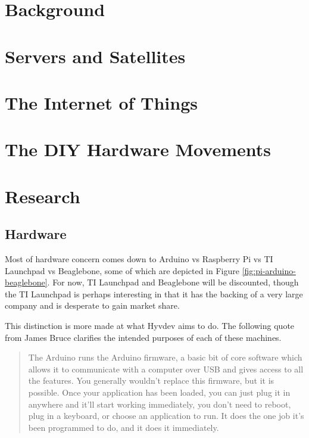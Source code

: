 \begin{multicols}{2}		

\section{Background}

	\section{Servers and Satellites}
	
	\section{The Internet of Things}
	
	\section{The DIY Hardware Movements}

\section{Research}

	\subsection{Hardware}
	
		Most of hardware concern comes down to Arduino vs Raspberry Pi vs TI Launchpad vs Beaglebone, some of which are depicted in Figure \ref{fig:pi-arduino-beaglebone}. 
		For now, TI Launchpad and Beaglebone will be discounted, though the TI Launchpad is perhaps interesting in that it has the backing of a very large company and is desperate to gain market share.
		
		This distinction is more made at what Hyvdev aims to do.
		The following quote from James Bruce clarifies the intended purposes of each of these machines.
		
		\begin{quote}
			The Arduino runs the Arduino firmware, a basic bit of core software which allows it to communicate with a computer over USB and gives access to all the features. You generally wouldn't replace this firmware, but it is possible. Once your application has been loaded, you can just plug it in anywhere and it'll start working immediately, you don't need to reboot, plug in a keyboard, or choose an application to run. It does the one job it's been programmed to do, and it does it immediately.
			

\end{quote}
\end{multicols}
